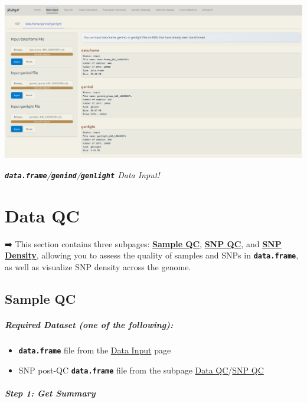 \documentclass[
]{book}
\begin{document}
\includegraphics[width=8.33333in,height=\textheight]{images/圖片17.png}

{\textbf{\emph{\texttt{data.frame}}}}\emph{/{\textbf{\texttt{genind}}}/{\textbf{\texttt{genlight}}} Data Input!}

\chapter{Data QC}\label{sec-data-qc}

➡️ This section contains three subpages: \ul{\textbf{Sample QC}}, \ul{\textbf{SNP QC}}, and \ul{\textbf{SNP Density}}, allowing you to assess the quality of samples and SNPs in {\textbf{\texttt{data.frame}}}, as well as visualize SNP density across the genome.

\section{Sample QC}\label{sample-qc}

\paragraph*{Required Dataset (one of the following):}\label{required-dataset-one-of-the-following-1}

\begin{itemize}
\item
  {\textbf{\texttt{data.frame}}} file from the \ul{Data Input} page
\item
  SNP post-QC {\textbf{\texttt{data.frame}}} file from the subpage \ul{Data QC}/\ul{SNP QC}
\end{itemize}

\paragraph*{Step 1: Get Summary}\label{step-1-get-summary}
\end{document}
